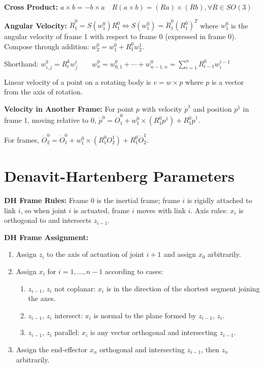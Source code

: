 \documentclass[twocolumn, 8pt]{extarticle}
\begin{document}
\textbf{Cross Product:} \(a \times b = -b \times a \quad R(a \times b) = (Ra) \times (Rb), \forall R \in SO(3)\)

\textbf{Angular Velocity:} \(\dot R_1^0 = S(w_1^0)R_1^0 \iff S(w_1^0) = \dot R_1^0(R_1^0)^T\) where \(w_1^0\) is the angular velocity of frame 1 with
respect to frame 0 (expressed in frame 0).
Compose through addition: \(w_2^0 = w_1^0 + R_1^0w_2^1\).

Shorthand: \(w_{i,j}^k = R_i^kw_j^i \qquad w_n^0 = w_{0,1}^0 + \cdots + w_{n - 1, n}^0 = \sum _{i = 1}^n R_{i - 1}^0w_i^{i - 1}\)

Linear velocity of a point on a rotating body is \(v = w \times p\) where \(p\) is a vector from the axis of rotation.

\textbf{Velocity in Another Frame:} For point \(p\) with velocity \(\dot p^1\) and position \(p^1\) in frame 1, moving
relative to 0, \(\dot p^0 = \dot O_1^0 + w_1^0 \times (R_1^0p^1) + R_1^0\dot p^1\).

For frames, \(\dot O_2^0 = \dot O_1^0 + w_1^0 \times (R_1^0O_2^1) + R_1^0\dot O_2^1\).

\section{Denavit-Hartenberg Parameters}

\textbf{DH Frame Rules:} Frame 0 is the inertial frame; frame \(i\) is rigidly attached to link \(i\), so when joint
\(i\) is actuated, frame \(i\) moves with link \(i\). Axis rules: \(x_i\) is orthogonal to and intersects \(z_{i - 1}\).

\textbf{DH Frame Assignment:}
\begin{enumerate}
    \item Assign \(z_i\) to the axis of actuation of joint \(i + 1\) and assign \(x_0\) arbitrarily.
    \item Assign \(x_i\) for \(i = 1, \dots, n - 1\) according to cases:
    \begin{enumerate}
        \item \(z_{i - 1}\), \(z_i\) not coplanar: \(x_i\) is in the direction of the shortest segment joining the axes.
        \item \(z_{i - 1}\), \(z_i\) intersect: \(x_i\) is normal to the plane formed by \(z_{i - 1}\), \(z_i\).
        \item \(z_{i - 1}\), \(z_i\) parallel: \(x_i\) is any vector orthogonal and intersecting \(z_{i - 1}\).
    \end{enumerate}
    \item Assign the end-effector \(x_n\) orthogonal and intersecting \(z_{i - 1}\), then \(z_n\) arbitrarily.
\end{enumerate}
\end{document}

